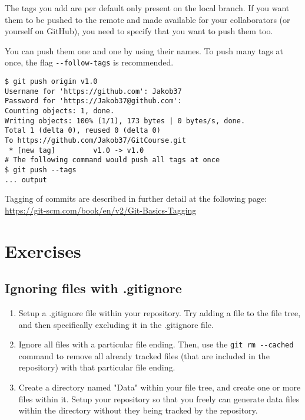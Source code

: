\documentclass[../main/git_course_main.tex]{subfiles}
\begin{document}
The tags you add are per default only present on the local branch. If you want them to be
pushed to the remote and made available for your collaborators (or yourself on GitHub), you need to specify that you want to push them too.

You can push them one and one by using their names. To push many tags at once, the flag \verb$--follow-tags$ is recommended.

\begin{codebox}
\begin{lstlisting}
$ git push origin v1.0
Username for 'https://github.com': Jakob37
Password for 'https://Jakob37@github.com': 
Counting objects: 1, done.
Writing objects: 100% (1/1), 173 bytes | 0 bytes/s, done.
Total 1 (delta 0), reused 0 (delta 0)
To https://github.com/Jakob37/GitCourse.git
 * [new tag]         v1.0 -> v1.0
# The following command would push all tags at once
$ git push --tags
... output
\end{lstlisting}
\end{codebox}

Tagging of commits are described in further detail at the following page: \\

\url{https://git-scm.com/book/en/v2/Git-Basics-Tagging} \\

%


\newpage
\section{Exercises}

\subsection{Ignoring files with .gitignore}

\begin{enumerate}
	\item Setup a .gitignore file within your repository. Try adding a file to the file tree, and then specifically excluding it in the .gitignore file.
	\item Ignore all files with a particular file ending. Then, use the \verb$git rm --cached$ command to remove all already tracked files (that are included in the repository) with that particular file ending.
	\item Create a directory named "Data" within your file tree, and create one or more files within it. Setup your repository so that you freely can generate data files within the directory without they being tracked by the repository.
\end{enumerate}
\end{document}
